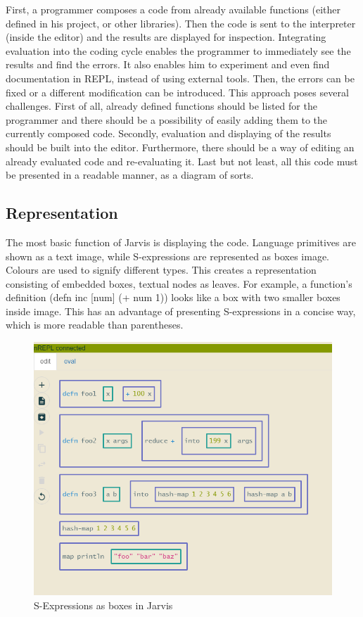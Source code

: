 \documentclass[11pt]{scrartcl}
\begin{document}
First, a programmer composes a code from already available functions (either defined in his project, or other libraries). Then the code is sent to the interpreter (inside the editor) and the results are displayed for inspection. Integrating evaluation into the coding cycle enables the programmer to immediately see the results and find the errors. It also enables him to experiment and even find documentation in REPL, instead of using external tools. Then, the errors can be fixed or a different modification can be introduced. This approach poses several challenges. First of all, already defined functions should be listed for the programmer and there should be a possibility of easily adding them to the currently composed code. Secondly, evaluation and displaying of the results should be built into the editor. Furthermore, there should be a way of editing an already evaluated code and re-evaluating it. Last but not least, all this code must be presented in a readable manner, as a diagram of sorts.
\subsection{Representation}
The most basic function of Jarvis is displaying the code. Language primitives are shown as a text {image}, while S-expressions are represented as boxes {image}. Colours are used to signify different types. This creates a representation consisting of embedded boxes, textual nodes as leaves. For example, a function’s definition (defn inc [num] (+ num 1)) looks like a box with two smaller boxes inside {image}. This has an advantage of presenting S-expressions in a concise way, which is more readable than parentheses.

\begin{figure}[hbt]
  \includegraphics[scale=0.3]{img/j-boxes_f}
  \caption{S-Expressions as boxes in Jarvis}
\end{figure}
\end{document}
